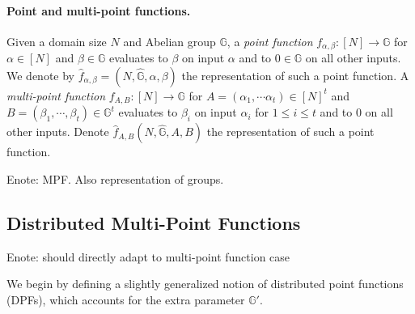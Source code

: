 \documentclass[sigconf]{acmart}
\newcommand{\Enote}[1]{\color{purple}Enote: #1\color{black}}
\newcommand{\GG}{\mathbb{G}}
\begin{document}
 \paragraph{Point and multi-point functions.} Given a domain size $N$ and Abelian group $\GG$, a \emph{point function} $f_{\alpha,\beta}:[N]\rightarrow\GG$ for $\alpha\in[N]$ and $\beta\in\GG$ evaluates to $\beta$ on input $\alpha$ and to $0\in\GG$ on all other inputs. We denote by $\hat{f}_{\alpha,\beta}=(N,\hat{\GG},\alpha,\beta)$ the representation of such a point function. A \emph{multi-point function} $f_{A,B}:[N]\rightarrow \GG$ for $A=(\alpha_1,\cdots\alpha_t)\in[N]^t$ and $B=(\beta_1,\cdots,\beta_t)\in \GG^t$ evaluates to $\beta_i$ on input $\alpha_i$ for $1\le i\le t$ and to $0$ on all other inputs. Denote $\hat{f}_{A,B}(N,\hat{\GG},A,B)$ the representation of such a point function. 
 
\Enote{MPF. Also representation of groups.}
 
\subsection{Distributed Multi-Point Functions}

\Enote{should directly adapt to multi-point function case}

We begin by defining a slightly generalized notion of distributed point functions (DPFs), which accounts for the extra parameter $\GG'$.
\end{document}
